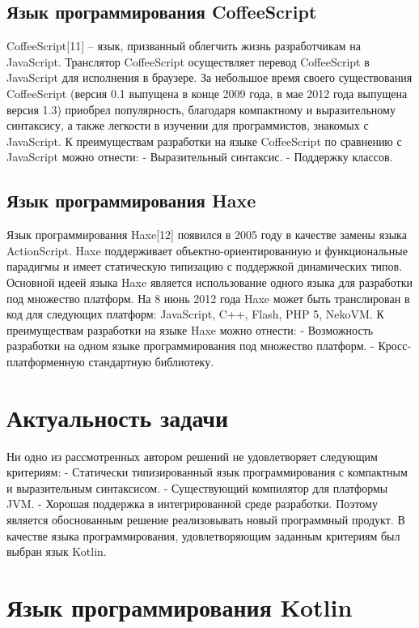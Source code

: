 \subsection{Язык программирования CoffeeScript}

CoffeeScript[11] – язык, призванный облегчить жизнь разработчикам на JavaScript.
Транслятор CoffeeScript осуществляет перевод CoffeeScript в JavaScript для исполнения в
браузере. За небольшое время своего существования CoffeeScript (версия 0.1 выпущена в
конце 2009 года, в мае 2012 года выпущена версия 1.3) приобрел популярность, благодаря
компактному и
выразительному синтаксису,
а
также
легкости
в
изучении
для
программистов, знакомых с JavaScript.
К преимуществам разработки на языке CoffeeScript по сравнению с JavaScript можно
отнести:
- Выразительный синтаксис.
- Поддержку классов.

\subsection{Язык программирования Haxe}

Язык программирования Haxe[12] появился в 2005 году в качестве замены языка
ActionScript. Haxe поддерживает объектно-ориентированную и функциональные парадигмы
и имеет статическую типизацию с поддержкой динамических типов. Основной идеей языка
Haxe является использование одного языка для разработки под множество платформ. На
8
июнь 2012 года Haxe может быть транслирован в код для следующих платформ: JavaScript,
C++, Flash, PHP 5, NekoVM.
К преимуществам разработки на языке Haxe можно отнести:
-
Возможность разработки на одном языке программирования под множество
платформ.
-
Кросс-платформенную стандартную библиотеку.

\section{Актуальность задачи}

Ни одно из рассмотренных автором решений не удовлетворяет следующим
критериям:
-
Статически типизированный язык программирования с компактным и
выразительным синтаксисом.
- Существующий компилятор для платформы JVM.
- Хорошая поддержка в интегрированной среде разработки.
Поэтому является обоснованным решение реализовывать новый программный
продукт. В качестве языка программирования, удовлетворяющим заданным критериям был
выбран язык Kotlin.

\section{Язык программирования Kotlin}

